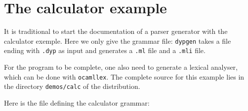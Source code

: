 \documentclass[12pt]{article}
\begin{document}
\tableofcontents

\section{The calculator example}

It is traditional to start the documentation of a parser generator
with the calculator exemple.  Here we only give the grammar file:
\texttt{dypgen} takes a file ending with \texttt{.dyp} as input and
generates a \texttt{.ml} file and a \texttt{.mli} file.

For the program to be complete, one also need to generate a lexical
analyser, which can be done with \texttt{ocamllex}. The complete
source for this example lies in the directory \texttt{demos/calc} of
the distribution.

Here is the file defining the calculator grammar:
\end{document}
